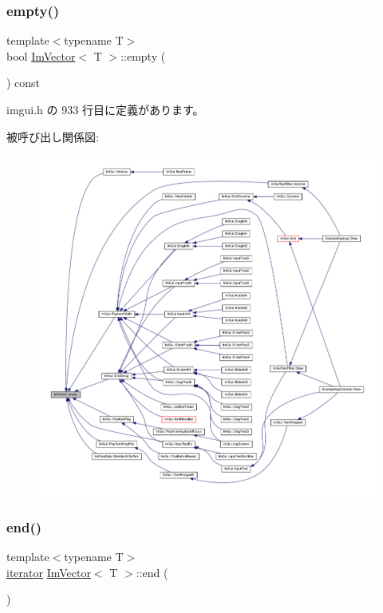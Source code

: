 \subsubsection{\texorpdfstring{empty()}{empty()}}
{\footnotesize\ttfamily template$<$typename T$>$ \\
bool \mbox{\hyperlink{class_im_vector}{Im\+Vector}}$<$ T $>$\+::empty (\begin{DoxyParamCaption}{ }\end{DoxyParamCaption}) const\hspace{0.3cm}{\ttfamily [inline]}}



 imgui.\+h の 933 行目に定義があります。

被呼び出し関係図\+:\nopagebreak
\begin{figure}[H]
\begin{center}
\leavevmode
\includegraphics[width=350pt]{class_im_vector_aa53e48a5272f4bad1099368769514ff1_icgraph}
\end{center}
\end{figure}
\mbox{\label{class_im_vector_a947fbc3b1d8c1997e51ae6caab440379}} 
\subsubsection{\texorpdfstring{end()}{end()}\hspace{0.1cm}{\footnotesize\ttfamily [1/2]}}
{\footnotesize\ttfamily template$<$typename T$>$ \\
\mbox{\hyperlink{class_im_vector_a74b5478f1f6fd471cc71219bce483db6}{iterator}} \mbox{\hyperlink{class_im_vector}{Im\+Vector}}$<$ T $>$\+::end (\begin{DoxyParamCaption}{ }\end{DoxyParamCaption})\hspace{0.3cm}{\ttfamily [inline]}}



